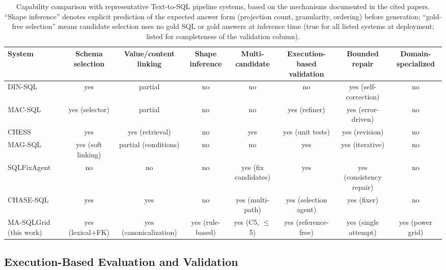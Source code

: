 \documentclass{ieeeaccess}
\begin{document}
\begin{table}[t]
\caption{Capability comparison with representative Text-to-SQL pipeline systems, based on the mechanisms documented in the cited papers. ``Shape inference'' denotes explicit prediction of the expected answer form (projection count, granularity, ordering) before generation; ``gold-free selection'' means candidate selection uses no gold SQL or gold answers at inference time (true for all listed systems at deployment; listed for completeness of the validation column).}
\label{tab:feature-comparison}
\centering
\footnotesize
\begin{adjustbox}{max width=\textwidth}
\begin{tabular}{lccccccc}
\toprule
System & Schema selection & Value/content linking & Shape inference & Multi-candidate & Execution-based validation & Bounded repair & Domain-specialized \\
\midrule
DIN-SQL \cite{pourreza2023dinsql} & yes & partial & no & no & no & yes (self-correction) & no \\
MAC-SQL \cite{wang2023macsql} & yes (selector) & partial & no & no & yes (refiner) & yes (error-driven) & no \\
CHESS \cite{talaei2024chess} & yes & yes (retrieval) & no & yes & yes (unit tests) & yes (revision) & no \\
MAG-SQL \cite{xie2024magsql} & yes (soft linking) & partial (conditions) & no & no & yes & yes (iterative) & no \\
SQLFixAgent \cite{cen2025sqlfixagent} & no & no & no & yes (fix candidates) & yes & yes (consistency repair) & no \\
CHASE-SQL \cite{pourreza2024chasesql} & yes & yes & no & yes (multi-path) & yes (selection agent) & yes (fixer) & no \\
MA-SQLGrid (this work) & yes (lexical+FK) & yes (canonicalization) & yes (rule-based) & yes (C5, $\le$5) & yes (reference-free) & yes (single attempt) & yes (power grid) \\
\bottomrule
\end{tabular}
\end{adjustbox}
\end{table}

\subsection{Execution-Based Evaluation and Validation}\label{execution-based-evaluation-and-validation}
\end{document}
